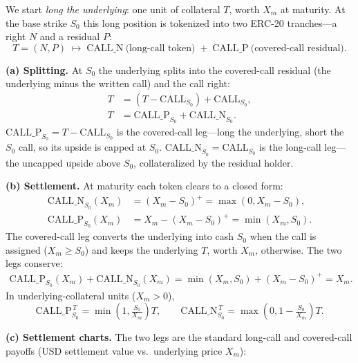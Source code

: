 \documentclass[11pt]{article}
\newcommand{\pos}[1]{\left(#1\right)^+}
\newcommand{\Call}{\mathrm{CALL}}
\newcommand{\CN}{\mathrm{CALL\_N}}
\newcommand{\CP}{\mathrm{CALL\_P}}
\newcommand{\CNat}[1]{\mathrm{CALL\_N}_{#1}}
\newcommand{\CPat}[1]{\mathrm{CALL\_P}_{#1}}
\begin{document}
We start \emph{long the underlying}: one unit of collateral $T$, worth $X_m$ at maturity.
At the base strike $S_0$ this long position is tokenized into two ERC-20 tranches---a right
$N$ and a residual $P$:
\[
T = (N,P) \;\longmapsto\; \CN\ \text{(long-call token)} \;+\; \CP\ \text{(covered-call residual)} .
\]

\textbf{(a) Splitting.} At $S_0$ the underlying splits into the covered-call residual (the
underlying minus the written call) and the call right:
\begin{align}
T &= (T-\Call_{S_0}) + \Call_{S_0},\\
T &= \CPat{S_0} + \CNat{S_0}.
\end{align}
$\CPat{S_0}=T-\Call_{S_0}$ is the covered-call leg---long the underlying, short the $S_0$
call, so its upside is capped at $S_0$. $\CNat{S_0}=\Call_{S_0}$ is the long-call leg---the
uncapped upside above $S_0$, collateralized by the residual holder.

\textbf{(b) Settlement.} At maturity each token clears to a closed form:
\begin{align}
\CNat{S_0}(X_m) &= \pos{X_m-S_0}=\max(0,X_m-S_0),\\
\CPat{S_0}(X_m) &= X_m-\pos{X_m-S_0}=\min(X_m,S_0).
\end{align}
The covered-call leg converts the underlying into cash $S_0$ when the call is assigned
($X_m\ge S_0$) and keeps the underlying $T$, worth $X_m$, otherwise. The two legs conserve:
\begin{align}
\CPat{S_0}(X_m)+\CNat{S_0}(X_m)=\min(X_m,S_0)+\pos{X_m-S_0}=X_m.
\end{align}
In underlying-collateral units ($X_m>0$),
\[
\CPat{S_0}^{\,T}=\min\!\left(1,\tfrac{S_0}{X_m}\right)T,
\qquad
\CNat{S_0}^{\,T}=\max\!\left(0,1-\tfrac{S_0}{X_m}\right)T.
\]

\textbf{(c) Settlement charts.} The two legs are the standard long-call and covered-call
payoffs (USD settlement value vs.\ underlying price $X_m$):
\end{document}
